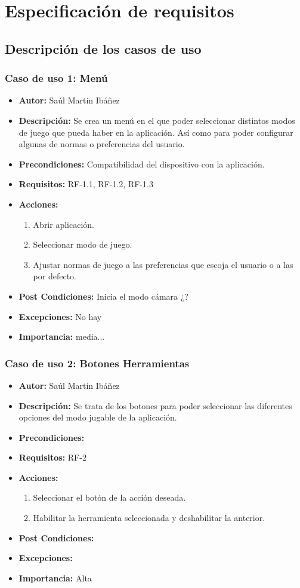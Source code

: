 \section{Especificación de requisitos}
\subsection{Descripción de los casos de uso}
\subsubsection{Caso de uso 1: Menú}
\begin{itemize}
	\item \textbf{Autor:} Saúl Martín Ibáñez
	\item \textbf{Descripción:} Se crea un menú en el que poder seleccionar distintos modos de juego que pueda haber en la aplicación. Así como para poder configurar algunas de normas o preferencias del usuario.
	\item \textbf{Precondiciones:} Compatibilidad del dispositivo con la aplicación.
	\item \textbf{Requisitos:} RF-1.1, RF-1.2, RF-1.3
	\item \textbf{Acciones:}
	\begin{enumerate}
		\item Abrir aplicación.
		\item Seleccionar modo de juego.
		\item Ajustar normas de juego a las preferencias que escoja el usuario o a las por defecto.
	\end{enumerate}
	\item \textbf{Post Condiciones:} Inicia el modo cámara ¿?
	\item \textbf{Excepciones:} No hay
	\item \textbf{Importancia:} media...
\end{itemize}
\subsubsection{Caso de uso 2: Botones Herramientas}
\begin{itemize}
	\item \textbf{Autor:} Saúl Martín Ibáñez
	\item \textbf{Descripción:} Se trata de los botones para poder seleccionar las diferentes opciones del modo jugable de la aplicación.
	\item \textbf{Precondiciones:}
	\item \textbf{Requisitos:} RF-2
	\item \textbf{Acciones:}
	\begin{enumerate}
		\item Seleccionar el botón de la acción deseada.
		\item Habilitar la herramienta seleccionada y deshabilitar la anterior. 
	\end{enumerate}
	\item \textbf{Post Condiciones:}
	\item \textbf{Excepciones:}
	\item \textbf{Importancia:} Alta
\end{itemize}
